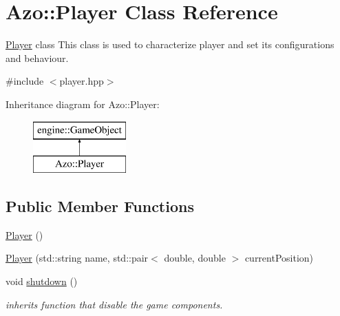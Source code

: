 \hypertarget{class_azo_1_1_player}{}\section{Azo\+:\+:Player Class Reference}
\label{class_azo_1_1_player}


\hyperlink{class_azo_1_1_player}{Player} class This class is used to characterize player and set its configurations and behaviour.  




{\ttfamily \#include $<$player.\+hpp$>$}

Inheritance diagram for Azo\+:\+:Player\+:\begin{figure}[H]
\begin{center}
\leavevmode
\includegraphics[height=2.000000cm]{class_azo_1_1_player}
\end{center}
\end{figure}
\subsection*{Public Member Functions}
\begin{DoxyCompactItemize}
\item 
\hyperlink{class_azo_1_1_player_a70594f977b11b9574450b1f4510f6ee5}{Player} ()
\item 
\hyperlink{class_azo_1_1_player_a4e229f75d3c2e31f502ca0bb48f6a42f}{Player} (std\+::string name, std\+::pair$<$ double, double $>$ current\+Position)
\item 
void \hyperlink{class_azo_1_1_player_a57070d462aa21dbfb8dc645b2a25bf86}{shutdown} ()
\begin{DoxyCompactList}\small\item\em inherits function that disable the game components. \end{DoxyCompactList}\end{DoxyCompactItemize}
